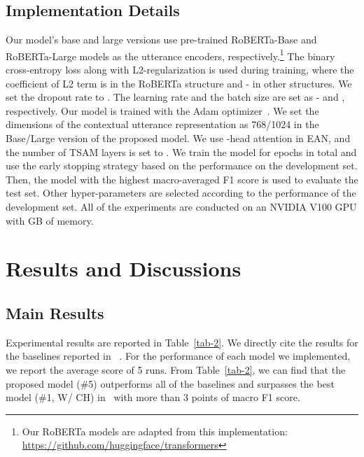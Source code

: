\documentclass[11pt]{article}
\begin{document}
\subsection{Implementation Details}
Our model's base and large versions use pre-trained RoBERTa-Base and RoBERTa-Large models as the utterance encoders, respectively.\footnote{Our RoBERTa models are adapted from this implementation: \url{https://github.com/huggingface/transformers}} The binary cross-entropy loss along with L2-regularization is used during training, where the coefficient of L2 term is  in the RoBERTa structure and - in other structures. We set the dropout rate to . The learning rate and the batch size are set as - and , respectively. Our model is trained with the Adam optimizer~\citep{kingma2015adam}. We set the dimensions of the contextual utterance representation  as 768/1024 in the Base/Large version of the proposed model. We use -head attention in EAN, and the number of TSAM layers  is set to . We train the model for  epochs in total and use the early stopping strategy based on the performance on the development set. Then, the model with the highest macro-averaged F1 score is used to evaluate the test set. Other hyper-parameters are selected according to the performance of the development set. All of the experiments are conducted on an NVIDIA V100 GPU with GB of memory.




\section{Results and Discussions}

\subsection{Main Results}
Experimental results are reported in Table~\ref{tab-2}. We directly cite the results for the baselines reported in ~\citep{poria2021recognizing}. For the performance of each model we implemented, we report the average score of 5 runs. From Table~\ref{tab-2}, we can find that the proposed model (\#5) outperforms all of the baselines and surpasses the best model (\#1, W/ CH) in~\citep{poria2021recognizing} with more than 3 points of macro F1 score. 
\end{document}
